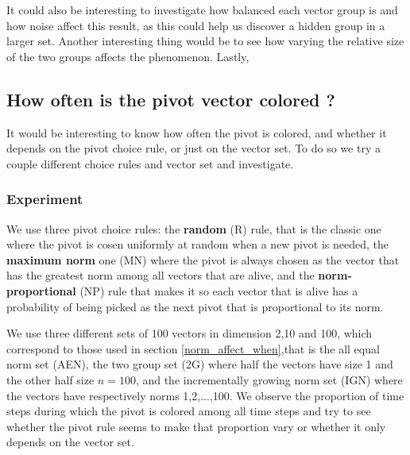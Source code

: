 \documentclass[12pt]{article}
\begin{document}
It could also be interesting to investigate how balanced each vector group is and how noise affect this result, as this could help us discover a hidden group in a larger set. Another interesting thing would be to see how varying the relative size of the two groups affects the phenomenon. Lastly, 

\subsection{How often is the pivot vector colored ?}\label{pivot_colored}
It would be interesting to know how often the pivot is colored, and whether it depends on the pivot choice rule, or just on the vector set. To do so we try a couple different choice rules and vector set and investigate.
\subsubsection{Experiment}
We use three pivot choice rules: the \textbf{random} (R) rule, that is the classic one where the pivot is cosen uniformly at random when a new pivot is needed, the \textbf{maximum norm} one (MN) where the pivot is always chosen as the vector that has the greatest norm among all vectors that are alive, and the \textbf{norm-proportional} (NP) rule that makes it so each vector that is alive has a probability of being picked as the next pivot that is proportional to its norm. 

We use three different sets of 100 vectors in dimension 2,10 and 100, which correspond to those used in section \ref{norm_affect_when},that is the all equal norm set (AEN), the two group set (2G) where half the vectors have size 1 and the other half size $n=100$, and the incrementally growing norm set (IGN) where the vectors have respectively norms 1,2,...,100. We observe the proportion of time steps during which the pivot is colored among all time steps and try to see whether the pivot rule seems to make that proportion vary or whether it only depends on the vector set.
\end{document}
